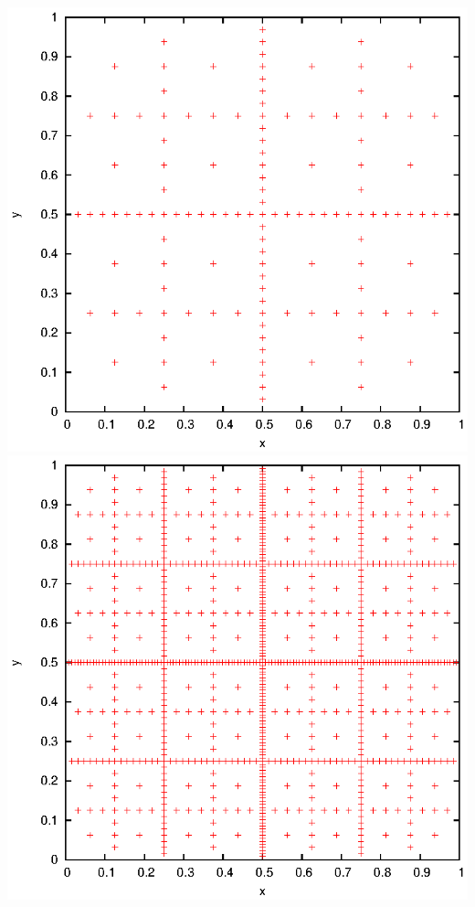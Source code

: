 \documentclass[]{article}
\begin{document}
\includegraphics{task11_trap_5}\\
\includegraphics{task11_trap_7}\\
\end{document}

